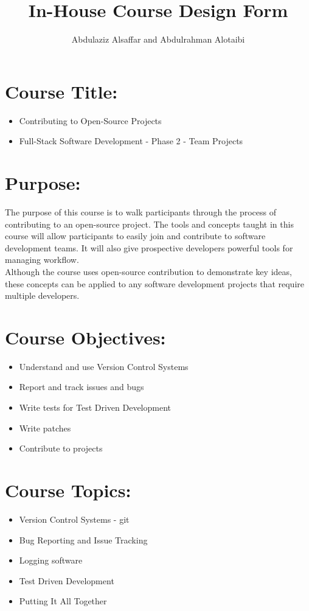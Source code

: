 \documentclass[a4paper,11pt]{article}
\author{Abdulaziz Alsa{f}far and Abdulrahman Alotaibi}
\title{In-House Course Design Form}
\begin{document}
\maketitle
\pagestyle{plain}
\setcounter{page}{1}

\section{Course Title:}
\begin{itemize}
	\item Contributing to Open-Source Projects
	\item Full-Stack Software Development - Phase 2 - Team Projects
\end{itemize}

\section{Purpose:}
The purpose of this course is to walk participants through the process of contributing to an open-source project.
The tools and concepts taught in this course will allow participants to easily join and contribute to software development teams. It will also give prospective developers powerful tools for managing workflow.\\
Although the course uses open-source contribution to demonstrate key ideas, these concepts can be applied to any software development projects that require multiple developers.

\section{Course Objectives:}
\begin{itemize}
	\item Understand and use Version Control Systems
	\item Report and track issues and bugs
	\item Write tests for Test Driven Development
	\item Write patches
	\item Contribute to projects
\end{itemize}

\section{Course Topics:}
\begin{itemize}
	\item Version Control Systems - git
	\item Bug Reporting and Issue Tracking
	\item Logging software
	\item Test Driven Development
	\item Putting It All Together
\end{itemize}
\end{document}
